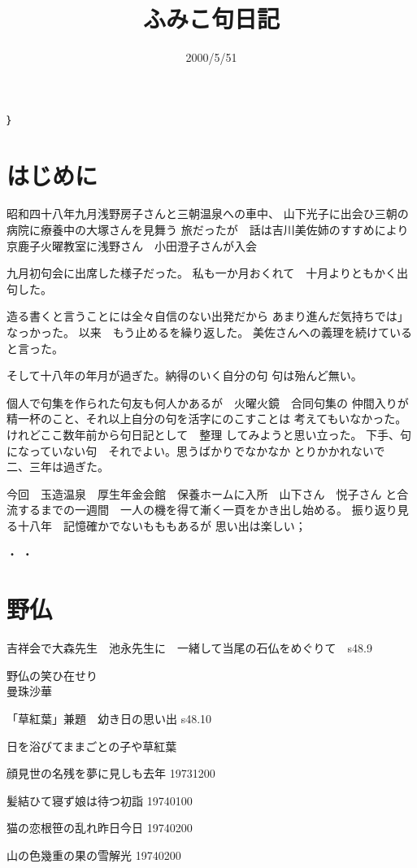 \documentclass[b5paper]{tbook}
\begin{document}
\title{ふみこ句日記}
\date{2000/5/51}
\maketitle｝

\chapter*{はじめに}
昭和四十八年九月浅野房子さんと三朝温泉への車中、
山下光子に出会ひ三朝の病院に療養中の大塚さんを見舞う
旅だったが　話は吉川美佐姉のすすめにより
京鹿子火曜教室に浅野さん　小田澄子さんが入会


九月初句会に出席した様子だった。
私も一か月おくれて　十月よりともかく出句した。

造る書くと言うことには全々自信のない出発だから
あまり進んだ気持ちでは」なっかった。
以来　もう止めるを繰り返した。
美佐さんへの義理を続けていると言った。

そして十八年の年月が過ぎた。納得のいく自分の句
句は殆んど無い。

個人で句集を作られた句友も何人かあるが　火曜火鏡　合同句集の
仲間入りが精一杯のこと、それ以上自分の句を活字にのこすことは
考えてもいなかった。けれどここ数年前から句日記として　整理
してみようと思い立った。
下手、句になっていない句　それでよい。思うばかりでなかなか
とりかかれないで　二、三年は過ぎた。

今回　玉造温泉　厚生年金会館　保養ホームに入所　山下さん　悦子さん
と合流するまでの一週間　一人の機を得て漸く一頁をかき出し始める。
振り返り見る十八年　記憶確かでないもももあるが
思い出は楽しい；


\hfill {   ・  ・  }


\chapter{野仏}
吉祥会で大森先生　池永先生に　一緒して当尾の石仏をめぐりて　s48.9
\begin{shiika}
野仏の笑ひ在せり
\\
曼珠沙華
\end{shiika}

\vspace{0.5cm}

「草紅葉」兼題　幼き日の思い出 s48.10
	

\begin{shiika}
日を浴びてままごとの子や草紅葉
\end{shiika}

\vspace{0.5cm}

	

顔見世の名残を夢に見しも去年	19731200

髪結ひて寝ず娘は待つ初詣	19740100

猫の恋根笹の乱れ昨日今日	19740200

山の色幾重の果の雪解光	19740200
\end{document}
